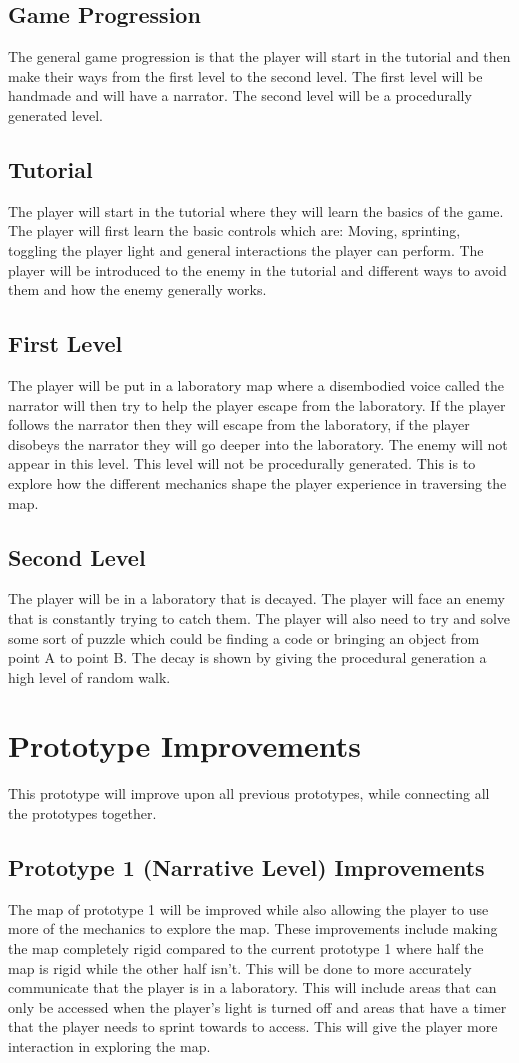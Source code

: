 \documentclass{article}
\begin{document}
\subsection{Game Progression}
The general game progression is that the player will start in the tutorial and then make their ways
from the first level to the second level. The first level will be handmade and will have
a narrator. The second level will be a procedurally generated level.
\subsection{Tutorial}
The player will start in the tutorial where they will learn the basics of the game. The player
will first learn the basic controls which are: Moving, sprinting, toggling the player light and
general interactions the player can perform. The player will be introduced to the enemy in the
tutorial and different ways to avoid them and how the enemy generally works.
\subsection{First Level}
The player will be put in a laboratory map where a disembodied voice called the narrator will then
try to help the player escape from the laboratory. If the player follows the narrator then they will
escape from the laboratory, if the player disobeys the narrator they will go deeper into the laboratory.
The enemy will not appear in this level. This level will not be procedurally generated. This is to explore
how the different mechanics shape the player experience in traversing the map.
\subsection{Second Level}
The player will be in a laboratory that is decayed. The player will face an enemy that is constantly trying
to catch them. The player will also need to try and solve some sort of puzzle which could be finding a code 
or bringing an object from point A to point B. The decay is shown by giving the procedural generation a high level of
random walk.

\section{Prototype Improvements}
This prototype will improve upon all previous prototypes, while connecting all the prototypes together.
\subsection{Prototype 1 (Narrative Level) Improvements}
The map of prototype 1 will be improved while also allowing the player to use more of the mechanics to
explore the map. These improvements include making the map completely rigid compared to the current prototype 1
where half the map is rigid while the other half isn't. This will be done to more accurately communicate that the
player is in a laboratory.
This will include areas that can only be accessed when the player's light is turned off
and areas that have a timer that the player needs to sprint towards to access. This will give the player
more interaction in exploring the map.
\end{document}
